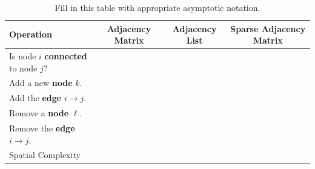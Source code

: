 \documentclass[letterpaper,12pt]{article}
\begin{document}

\begin{table}[H]
	\centering
	\renewcommand*{\arraystretch}{2.0}
	\begin{tabular}{|p{4.5cm}|c|c|c|} \hline
		\textbf{Operation} & \textbf{Adjacency Matrix} & \textbf{Adjacency List} & \textbf{Sparse Adjacency Matrix} \\ \hline
		Is node $i$ \textbf{connected} to node $j$? & & & \\ \hline
		Add a new \textbf{node} $k$. & & & \\ \hline
		Add the \textbf{edge} $i \rightarrow j$. & & & \\  \hline
		Remove a \textbf{node} $\ell$. & & & \\ \hline
		Remove the \textbf{edge} $i \rightarrow j$.  & & & \\ \hline
		Spatial Complexity & & & \\  \hline
	\end{tabular}
	\caption{Fill in this table with appropriate asymptotic notation.}
	\label{tbl:complexities}
\end{table}		

\vspace{.8in}
\end{document}
